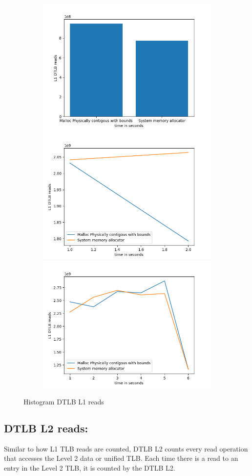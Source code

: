 \begin{figure}
  \begin{subfigure}{\linewidth}
    \includegraphics[width=.5\linewidth]{BenchmarkRuns/histogram/l1d_tlb_walk_histogram_small.png}\hfill
    \includegraphics[width=.5\linewidth]{BenchmarkRuns/histogram/l1_data_histogram_medium.png}\hfill
    \includegraphics[width=.5\linewidth]{BenchmarkRuns/histogram/tlb_l1_data_histogram_large.png}
  \caption{}
  \end{subfigure}
  \caption{Histogram DTLB L1 reads}
\end{figure}

\subsection{DTLB L2 reads:}
Similar to how L1 TLB reads are counted, DTLB L2 counts every read operation that accesses the 
Level 2 data or unified TLB. Each time there is a read to an entry in the Level 2 TLB, 
it is counted by the DTLB L2. 

